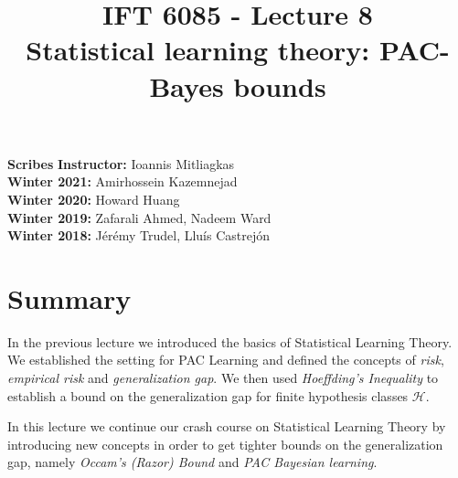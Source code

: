 \documentclass{article}
\title{IFT 6085 - Lecture 8 \\ 
Statistical learning theory: PAC-Bayes bounds}
\date{}
\begin{document}
 

\maketitle
\textbf{Scribes}\hfill
\textbf{Instructor:} Ioannis Mitliagkas\\
\textbf{Winter 2021:} Amirhossein Kazemnejad\\
\textbf{Winter 2020:} Howard Huang\\
\textbf{Winter 2019:} Zafarali Ahmed, Nadeem Ward\\
\textbf{Winter 2018:} Jérémy Trudel, Lluís Castrejón
\hfill



\newcommand{\infgc}{\inf_{g \in \mathcal{C}}}
\newcommand{\supgc}{\sup_{g \in \mathcal{C}}}

\newcommand{\Prob}{\mathbb{P}}
\newcommand{\E}{\mathbb{E}}
\newcommand{\reals}{\mathbb{R}}


\section{Summary}
In the previous lecture we introduced the basics of Statistical Learning Theory. We established the setting for PAC Learning and defined the concepts of \textit{risk}, \textit{empirical risk} and \textit{generalization gap}. We then used \textit{Hoeffding's Inequality} to establish a bound on the generalization gap for finite hypothesis classes $\mathcal{H}$.

\vspace{2ex}

In this lecture we continue our crash course on Statistical Learning Theory by introducing new concepts in order to get tighter bounds on the generalization gap, namely \textit{Occam's (Razor) Bound} and \textit{PAC Bayesian learning}. 
\end{document}
